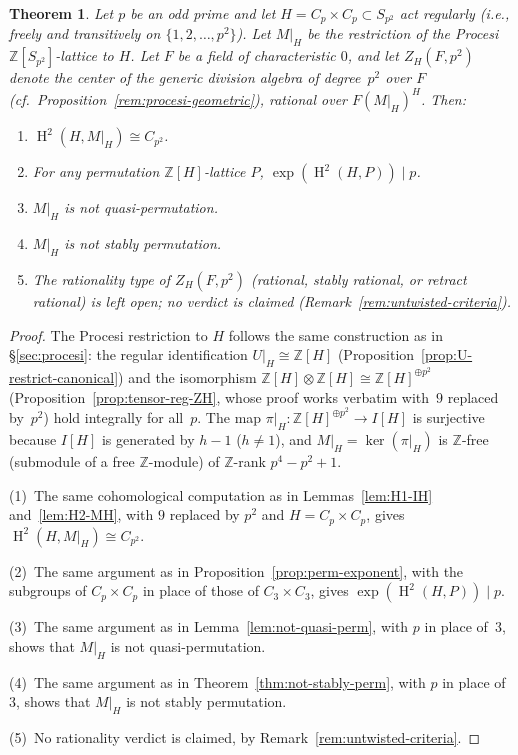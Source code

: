 \documentclass[12pt,a4paper]{article}
\newtheorem{theorem}{Theorem}[section]
\theoremstyle{definition}
\DeclareMathOperator{\coh}{H}
\begin{document}
\begin{theorem}\label{thm:Cp-general}
Let \(p\) be an odd prime and let \(H = C_p \times C_p \subset S_{p^2}\)
act regularly (i.e., freely and transitively on
\(\{1, 2, \dots, p^2\}\)).  Let \(M|_H\) be the restriction of the
Procesi \(\mathbb{Z}[S_{p^2}]\)-lattice to \(H\).  Let \(F\) be a field
of characteristic \(0\), and let \(Z_H(F, p^2)\) denote the center of the
generic division algebra of degree~\(p^2\) over \(F\)
(cf.\ Proposition~\ref{rem:procesi-geometric}), rational over
\(F(M|_H)^H\).  Then:
\begin{enumerate}
  \item \(\coh^2(H, M|_H) \cong C_{p^2}\).
  \item For any permutation \(\mathbb{Z}[H]\)-lattice \(P\),
    \(\exp(\coh^2(H, P)) \mid p\).
  \item \(M|_H\) is not quasi-permutation.
  \item \(M|_H\) is not stably permutation.
  \item The rationality type of \(Z_H(F, p^2)\) (rational, stably
    rational, or retract rational) is left open; no verdict is claimed
    (Remark~\ref{rem:untwisted-criteria}).
\end{enumerate}
\end{theorem}

\begin{proof}
The Procesi restriction to \(H\) follows the same construction as
in \S\ref{sec:procesi}: the regular identification \(U|_H \cong \mathbb{Z}[H]\)
(Proposition~\ref{prop:U-restrict-canonical})
and the isomorphism
\(\mathbb{Z}[H] \otimes \mathbb{Z}[H] \cong \mathbb{Z}[H]^{\oplus p^2}\)
(Proposition~\ref{prop:tensor-reg-ZH}, whose proof works verbatim
with~\(9\) replaced by~\(p^2\)) hold integrally for
all~\(p\).  The map \(\pi|_H : \mathbb{Z}[H]^{\oplus p^2} \to I[H]\) is
surjective because \(I[H]\) is generated by \(h-1\) (\(h \neq 1\)), and
\(M|_H = \ker(\pi|_H)\) is \(\mathbb{Z}\)-free (submodule of a free
\(\mathbb{Z}\)-module) of \(\mathbb{Z}\)-rank \(p^4 - p^2 + 1\).

\medskip\noindent
(1)~The same cohomological computation as in Lemmas~\ref{lem:H1-IH}
and~\ref{lem:H2-MH}, with \(9\) replaced by \(p^2\) and \(H = C_p \times C_p\),
gives \(\coh^2(H, M|_H) \cong C_{p^2}\).

\medskip\noindent
(2)~The same argument as in Proposition~\ref{prop:perm-exponent},
with the subgroups of \(C_p \times C_p\) in place of those of
\(C_3 \times C_3\), gives \(\exp(\coh^2(H, P)) \mid p\).

\medskip\noindent
(3)~The same argument as in Lemma~\ref{lem:not-quasi-perm}, with \(p\)
in place of~\(3\), shows that \(M|_H\) is not quasi-permutation.

\medskip\noindent
(4)~The same argument as in Theorem~\ref{thm:not-stably-perm}, with \(p\)
in place of~\(3\), shows that \(M|_H\) is not stably permutation.

\medskip\noindent
(5)~No rationality verdict is claimed, by
Remark~\ref{rem:untwisted-criteria}.
\end{proof}
\end{document}
